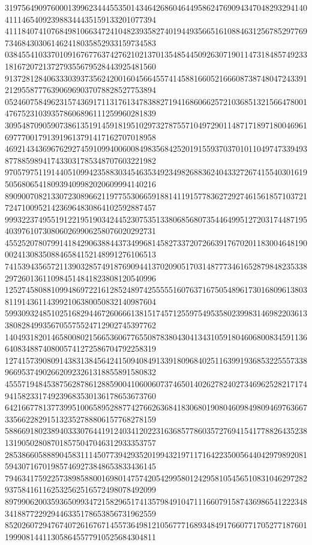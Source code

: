 \begin{DoxyCode}
      319756490976000139962344455350143464268604644958624769094347048293294140411146540923988344435159133201077394
      411184074107684981066347241048239358274019449356651610884631256785297769734684303061462418035852933159734583
      038455410337010916767763742762102137013548544509263071901147318485749233181672072137279355679528443925481560
      913728128406333039373562420016045664557414588166052166608738748047243391212955877763906969037078828527753894
      052460758496231574369171131761347838827194168606625721036851321566478001476752310393578606896111259960281839
      309548709059073861351914591819510297327875571049729011487171897180046961697770017913919613791417162707018958
      469214343696762927459109940060084983568425201915593703701011049747339493877885989417433031785348707603221982
      970579751191440510994235883034546353492349826883624043327267415540301619505680654180939409982020609994140216
      890900708213307230896621197755306659188141191577836272927461561857103721724710095214236964830864102592887457
      999322374955191221951903424452307535133806856807354464995127203174487195403976107308060269906258076020292731
      455252078079914184290638844373499681458273372072663917670201183004648190002413083508846584152148991276106513
      741539435657211390328574918769094413702090517031487773461652879848235338297260136110984514841823808120540996
      125274580881099486972216128524897425555516076371675054896173016809613803811914361143992106380050832140987604
      599309324851025168294467260666138151745712559754953580239983146982203613380828499356705575524712902745397762
      140493182014658008021566536067765508783804304134310591804606800834591136640834887408005741272586704792258319
      127415739080914383138456424150940849133918096840251163991936853225557338966953749026620923261318855891580832
      455571948453875628786128859004106006073746501402627824027346962528217174941582331749239683530136178653673760
      642166778137739951006589528877427662636841830680190804609849809469763667335662282915132352788806157768278159
      588669180238940333076441912403412022316368577860357276941541778826435238131905028087018575047046312933353757
      285386605888904583111450773942935201994321971171642235005644042979892081594307167019857469273848653833436145
      794634175922573898588001698014757420542995801242958105456510831046297282937584161162532562516572498078492099
      897990620035936509934721582965174135798491047111660791587436986541222348341887722929446335178653856731962559
      852026072947674072616767145573649812105677716893484917660771705277187601199908144113058645577910525684304811

\end{DoxyCode}
